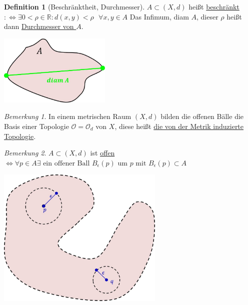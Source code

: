 \documentclass[a4paper,11pt,notitlepage]{report}
\theoremstyle{remark}
\newtheorem{remark}{Bemerkung}[chapter]
\theoremstyle{definition}
\newtheorem{definition}{Definition}[chapter]
\newcommand{\R}{{\ensuremath{\mathbb{R}}}}
\newcommand{\OO}{{\ensuremath{\mathcal{O}}}}
\begin{document}
\begin{definition}[Beschränktheit, Durchmesser]
	$A \subset (X,d)$ heißt \underline{beschränkt} \newline $:\Leftrightarrow \exists 0 < \rho \in \R \colon d(x,y) < \rho  \text{   } \forall x,y \in A$
	\newline
	Das Infimum, diam $A$, dieser $\rho$ heißt dann \underline{Durchmesser von $A$}.
	\newline
	\begin{center}
	\includegraphics[width=0.4\textwidth]{images/Durchmesser.jpg}
	\end{center}
\end{definition}
	
\begin{remark}
	In einem metrischen Raum $(X,d)$ bilden die offenen Bälle die Basis einer Topologie $\OO=\OO_d$ von $X$, diese heißt \underline{die von der Metrik induzierte Topologie}.
\end{remark}

\begin{remark}
	$A \subset (X,d)$ ist \underline{offen}
	\newline
	$\Leftrightarrow \forall p \in A \exists \text{ ein offener Ball } B_\epsilon(p) \text{ um } p \text{ mit } B_\epsilon(p) \subset A$
	\newline
	\begin{center}
	\includegraphics[width=0.6\textwidth]{images/metrisch_offen.jpg}
	\end{center}
\end{remark}
\end{document}
